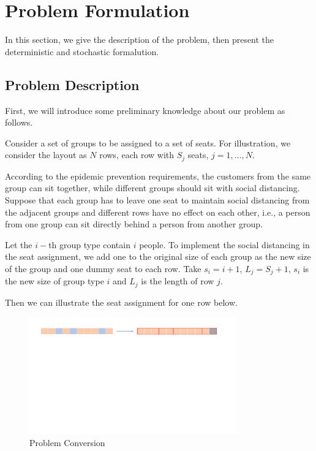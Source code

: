 \section{Problem Formulation}
In this section, we give the description of the problem, then present the deterministic and stochastic formalution.

\subsection{Problem Description}

First, we will introduce some preliminary knowledge about our problem as follows.

Consider a set of groups to be assigned to a set of seats. For illustration, we consider the layout as $N$ rows, each row with $S_{j}$ seats, $j = 1, \ldots, N$. 

According to the epidemic prevention requirements, the customers from the same group can sit together, while different groups should sit with social distancing. 
Suppose that each group has to leave one seat to maintain social distancing from the adjacent groups and different rows have no effect on each other, i.e., a person from one group can sit directly behind a person from another group.

Let the $i-$th group type contain $i$ people. To implement the social distancing in the seat assignment, we add one to the original size of each group as the new size of the group and one dummy seat to each row. Take $s_{i} = i + 1$, $L_{j} = S_{j} +1$, $s_{i}$ is the new size of group type $i$ and $L_{j}$ is the length of row $j$.

Then we can illustrate the seat assignment for one row below. 

\begin{figure}[ht]
    \centering
    \includegraphics[width = 0.8\textwidth]{./Figures/dummy_seat.pdf}
    \caption{Problem Conversion}
\end{figure}

